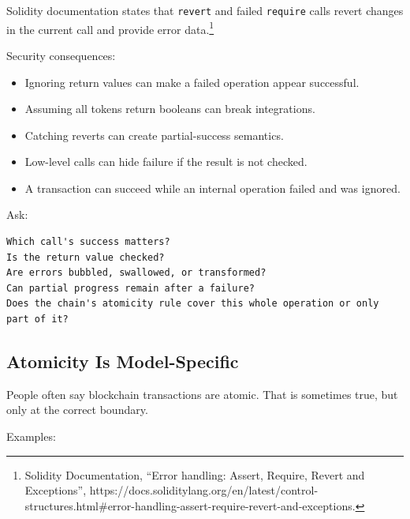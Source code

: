 Solidity documentation states that \passthrough{\lstinline!revert!} and
failed \passthrough{\lstinline!require!} calls revert changes in the
current call and provide error data.\footnote{Solidity Documentation,
  ``Error handling: Assert, Require, Revert and Exceptions'',
  https://docs.soliditylang.org/en/latest/control-structures.html\#error-handling-assert-require-revert-and-exceptions.}

Security consequences:

\begin{itemize}
\tightlist
\item
  Ignoring return values can make a failed operation appear successful.
\item
  Assuming all tokens return booleans can break integrations.
\item
  Catching reverts can create partial-success semantics.
\item
  Low-level calls can hide failure if the result is not checked.
\item
  A transaction can succeed while an internal operation failed and was
  ignored.
\end{itemize}

Ask:

\begin{lstlisting}
Which call's success matters?
Is the return value checked?
Are errors bubbled, swallowed, or transformed?
Can partial progress remain after a failure?
Does the chain's atomicity rule cover this whole operation or only part of it?
\end{lstlisting}

\subsection{Atomicity Is Model-Specific}

People often say blockchain transactions are atomic. That is sometimes
true, but only at the correct boundary.

Examples:

